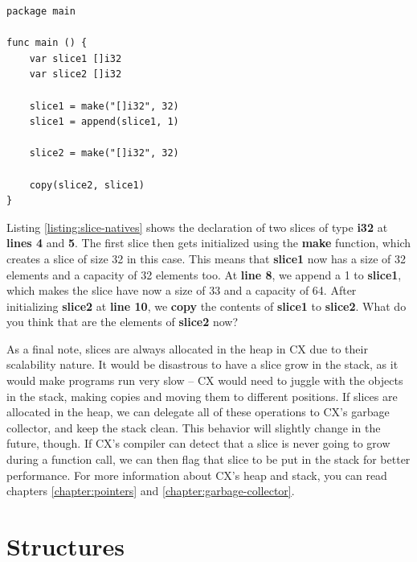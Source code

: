 \documentclass[11pt,fleqn,openany]{book} %
\begin{document}
\begin{lstlisting}[caption={Slice-specific native functions},captionpos=b,label={listing:slice-natives}]
package main

func main () {
	var slice1 []i32
    var slice2 []i32
    
    slice1 = make("[]i32", 32)
    slice1 = append(slice1, 1)
    
    slice2 = make("[]i32", 32)
    
    copy(slice2, slice1)
}
\end{lstlisting}

Listing \ref{listing:slice-natives} shows the declaration of two slices of type \textbf{i32} at \textbf{lines 4} and \textbf{5}. The first slice then gets initialized using the \textbf{make} function, which creates a slice of size 32 in this case. This means that \textbf{slice1} now has a size of 32 elements and a capacity of 32 elements too. At \textbf{line 8}, we append a 1 to \textbf{slice1}, which makes the slice have now a size of 33 and a capacity of 64. After initializing \textbf{slice2} at \textbf{line 10}, we \textbf{copy} the contents of \textbf{slice1} to \textbf{slice2}. What do you think that are the elements of \textbf{slice2} now?

As a final note, slices are always allocated in the heap in CX due to their scalability nature. It would be disastrous to have a slice grow in the stack, as it would make programs run very slow -- CX would need to juggle with the objects in the stack, making copies and moving them to different positions. If slices are allocated in the heap, we can delegate all of these operations to CX's garbage collector, and keep the stack clean. This behavior will slightly change in the future, though. If CX's compiler can detect that a slice is never going to grow during a function call, we can then flag that slice to be put in the stack for better performance. For more information about CX's heap and stack, you can read chapters \ref{chapter:pointers} and \ref{chapter:garbage-collector}.

\section{Structures}

\end{document}
